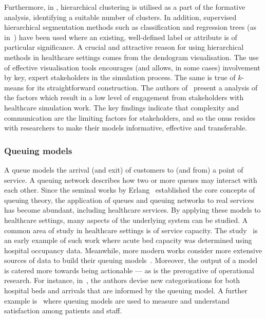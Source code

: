 Furthermore, in \cite{Vuik2016a}, hierarchical clustering is utilised as a part
of the formative analysis, identifying a suitable number of clusters. In
addition, supervised hierarchical segmentation methods such as classification
and regression trees (as in~\cite{Harper2006,Kumar2019}) have been used where an
existing, well-defined label or attribute is of particular significance. A
crucial and attractive reason for using hierarchical methods in healthcare
settings comes from the dendogram visualisation. The use of effective
visualisation tools encourages (and allows, in some cases) involvement by key,
expert stakeholders in the simulation process. The same is true of \(k\)-means
for its straightforward construction. The authors of~\cite{Jahangirian2015}
present a analysis of the factors which result in a low level of engagement from
stakeholders with healthcare simulation work. The key findings indicate that
complexity and communication are the limiting factors for stakeholders, and so
the onus resides with researchers to make their models informative, effective
and transferable.

\subsubsection{Queuing models}\label{subsubsec:queuing}

A queue models the arrival (and exit) of customers to (and from) a point of
service. A queuing network describes how two or more queues may interact with
each other. Since the seminal works by Erlang~\cite{Erlang1917,Erlang1920}
established the core concepts of queuing theory, the application of queues and
queuing networks to real services has become abundant, including healthcare
services. By applying these models to healthcare settings, many aspects of the
underlying system can be studied. A common area of study in healthcare settings
is of service capacity. The study~\cite{McClain1976} is an early example of such
work where acute bed capacity was determined using hospital occupancy data.
Meanwhile, more modern works consider more extensive sources of data to build
their queuing models~\cite{Palvannan2012,Pinto2014,Williams2015}. Moreover, the
output of a model is catered more towards being actionable --- as is the
prerogative of operational research. For instance, in~\cite{Pinto2014}, the
authors devise new categorisations for both hospital beds and arrivals that are
informed by the queuing model. A further example is~\cite{Komashie2015} where
queuing models are used to measure and understand satisfaction among patients
and staff.

